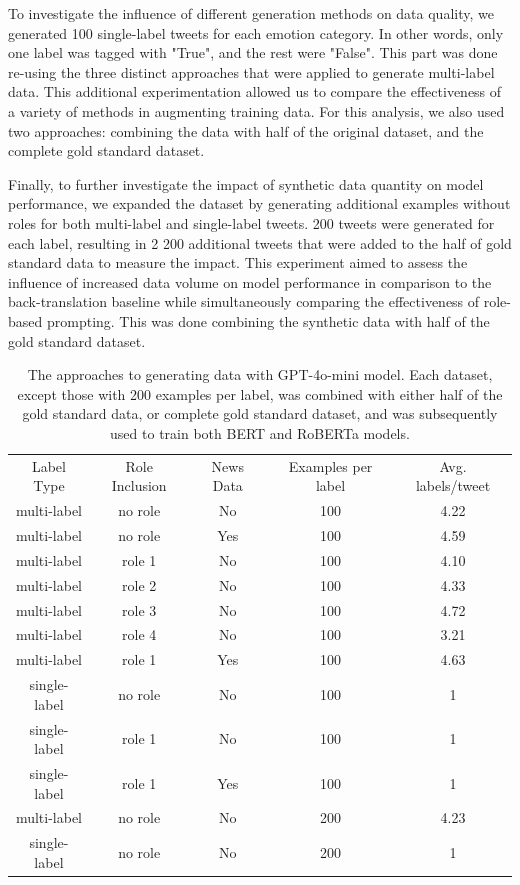 \documentclass[manuscript]{clv3}
\begin{document}
To investigate the influence of different generation methods on data quality, we generated 100 single-label tweets for each emotion category. In other words, only one label was tagged with "True", and the rest were "False". This part was done re-using the three distinct approaches that were applied to generate multi-label data. This additional experimentation allowed us to compare the effectiveness of a variety of methods in augmenting training data. For this analysis, we also used two approaches: combining the data with half of the original dataset, and the complete gold standard dataset.

Finally, to further investigate the impact of synthetic data quantity on model performance, we expanded the dataset by generating additional examples without roles for both multi-label and single-label tweets. 200 tweets were generated for each label, resulting in 2 200 additional tweets that were added to the half of gold standard data to measure the impact. This experiment aimed to assess the influence of increased data volume on model performance in comparison to the back-translation baseline while simultaneously comparing the effectiveness of role-based prompting. This was done combining the synthetic data with half of the gold standard dataset.

\begin{table}
    \centering
    \begin{tabular}{ccccc}
           Label Type&  Role Inclusion&  News Data&  Examples per label &Avg. labels/tweet\\
           multi-label&  no role&  No&  100 &4.22\\
           multi-label&  no role&  Yes&  100 &4.59\\
           multi-label&  role 1&  No&  100 &4.10\\
           multi-label&  role 2&  No&  100 &4.33\\
           multi-label&  role 3&  No&  100 &4.72\\
           multi-label&  role 4&  No&  100 &3.21\\
           multi-label&  role 1&  Yes&  100 &4.63\\
           single-label&  no role&  No&  100 &1\\
  single-label& role 1& No&100 &1\\
  single-label& role 1& Yes&100 &1\\
           multi-label&  no role&  No&  200 &4.23\\
  single-label& no role& No&200 &1\\
    \end{tabular}
    \caption{The approaches to generating data with GPT-4o-mini model. Each dataset, except those with 200 examples per label, was combined with either half of the gold standard data, or complete gold standard dataset, and was subsequently used to train both BERT and RoBERTa models.}
    \label{tab:approaches}
\end{table}
\end{document}

